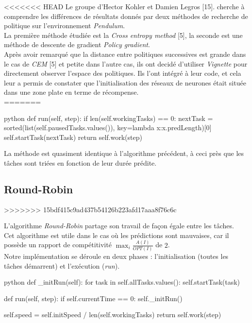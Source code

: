 \documentclass[12pt]{article}
\begin{document}
<<<<<<< HEAD
Le groupe d'Hector Kohler et Damien Legros [15]. cherche à comprendre les différences de résultats donnés par deux méthodes de recherche de politique sur l'environnement \emph{Pendulum}. \\

La première méthode étudiée est la \emph{Cross entropy method} [5], la seconde est une méthode de descente de gradient \emph{Policy gradient}. \\

Après avoir remarqué que la distance entre politiques successives est grande dans le cas de \emph{CEM} [5] et petite dans l'autre cas, ils ont decidé d'utiliser \emph{Vignette} pour directement observer l'espace des politiques. Ils l'ont intégré à leur code, et cela leur a permis de constater que l'initialisation des réseaux de neurones était située dans une zone plate en terme de récompense. \\
=======
\begin{mintedbox}{python}
    def run(self, step):
        if len(self.workingTasks) == 0:
            nextTask = sorted(list(self.pausedTasks.values()), key=lambda x:x.predLength)[0]
            self.startTask(nextTask)
        return self.work(step)
\end{mintedbox}

La méthode est quasiment identique à l'algorithme précédent, à ceci près que les tâches sont triées en fonction de leur durée prédite.

\subsection{Round-Robin}
>>>>>>> 15bdf415c9ad437b54126b223afd17aaa8f76c6c

L'algorithme \emph{Round-Robin} partage son travail de façon égale entre les tâches. \\

Cet algorithme est utile dans le cas où les prédictions sont mauvaises, car il possède un rapport de compétitivité $\max_i {\frac {A(I)} {OPT(I)}}$ de $2$. \\

Notre implémentation se déroule en deux phases : l'initialisation (toutes les tâches démarrent) et l'exécution (\emph{run}). \\

\begin{mintedbox}{python}
    def _initRun(self):
        for task in self.allTasks.values():
            self.startTask(task)
            
    def run(self, step):
        if self.currentTime == 0:
            self._initRun()

        self.speed = self.initSpeed / len(self.workingTasks)
        return self.work(step)
\end{mintedbox}
\end{document}
